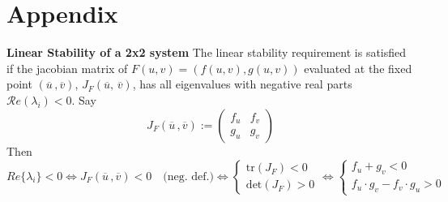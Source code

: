 \chapter*{Appendix}
\textbf{Linear Stability of a 2x2 system}
\label{app:bifurcation_diagram}
 The linear stability requirement is satisfied if the jacobian matrix of $F(u,v) = (f(u,v), g(u,v))$ evaluated at the fixed point $(\overline{u}\,, \overline{v})$, $J_F(\overline{u},\, \overline{v})$, has all eigenvalues with negative real parts $\mathcal{R}e(\lambda_i)<0$. Say 
 \begin{equation*}
 		J_{F}(\overline{u}\,, \overline{v}) := \begin{pmatrix}
 			f_u & f_v \\
 			g_u & g_v
 		\end{pmatrix}
 \end{equation*}
Then
$$
Re\{\lambda_i\} <0 \iff 	J_{F}(\overline{u}\,, \overline{v})< 0\quad  \text{(neg. def.)} \iff \begin{cases}
		\text{tr}(J_F) < 0 \\
		\text{det}(J_F)>0
	\end{cases}
	\iff \begin{cases}
		f_u + g_v < 0 \\
		f_u\cdot g_v - f_v\cdot g_u>0
	\end{cases}
$$



